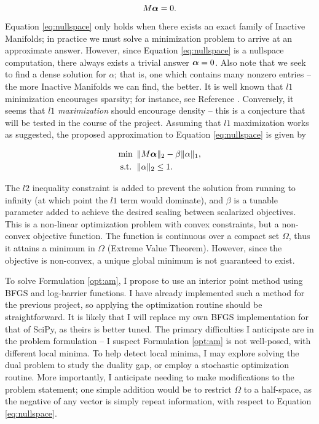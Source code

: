 \documentclass{article}
\begin{document}
\begin{equation}
M\boldsymbol{\alpha} = 0. \label{eq:nullspace}
\end{equation}

Equation \ref{eq:nullspace} only holds when there exists an exact family of Inactive Manifolds; in practice we must solve a minimization problem to arrive at an approximate answer. However, since Equation \ref{eq:nullspace} is a nullspace computation, there always exists a trivial answer $\boldsymbol{\alpha}=0$. Also note that we seek to find a dense solution for $\alpha$; that is, one which contains many nonzero entries -- the more Inactive Manifolds we can find, the better. It is well known that $l1$ minimization encourages sparsity; for instance, see Reference \cite{donoho2006}. Conversely, it seems that $l1$ \emph{maximization} should encourage density -- this is a conjecture that will be tested in the course of the project. Assuming that $l1$ maximization works as suggested, the proposed approximation to Equation \ref{eq:nullspace} is given by

\begin{equation}
\begin{aligned}
\text{min  }\, &\|M\boldsymbol{\alpha}\|_2 - \beta\|\alpha\|_1, \label{opt:am} \\
\text{s.t. }\, &\|\alpha\|_2 \leq 1.
\end{aligned}
\end{equation}

The $l2$ inequality constraint is added to prevent the solution from running to infinity (at which point the $l1$ term would dominate), and $\beta$ is a tunable parameter added to achieve the desired scaling between scalarized objectives. This is a non-linear optimization problem with convex constraints, but a non-convex objective function. The function is continuous over a compact set $\Omega$, thus it attains a minimum in $\Omega$ (Extreme Value Theorem). However, since the objective is non-convex, a unique global minimum is not guaranteed to exist.

To solve Formulation \ref{opt:am}, I propose to use an interior point method using BFGS and log-barrier functions. I have already implemented such a method for the previous project, so applying the optimization routine should be straightforward. It is likely that I will replace my own BFGS implementation for that of SciPy, as theirs is better tuned. \cite{jones2001} The primary difficulties I anticipate are in the problem formulation -- I suspect Formulation \ref{opt:am} is not well-posed, with different local minima. To help detect local minima, I may explore solving the dual problem to study the duality gap, or employ a stochastic optimization routine. More importantly, I anticipate needing to make modifications to the problem statement; one simple addition would be to restrict $\Omega$ to a half-space, as the negative of any vector is simply repeat information, with respect to Equation \ref{eq:nullspace}.
\end{document}

